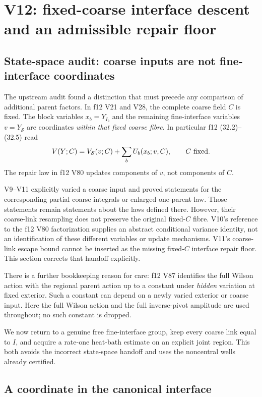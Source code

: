 \documentclass[11pt,oneside]{article}
\begin{document}
\section{V12: fixed-coarse interface descent and an admissible repair floor}
\label{sec:f13v12}

\subsection{State-space audit: coarse inputs are not fine-interface coordinates}

The upstream audit found a distinction that must precede
any comparison of additional parent factors. In f12 V21
and V28, the complete coarse field \(C\) is fixed.
The block variables \(x_b=Y_{I_b}\) and the remaining
fine-interface variables \(v=Y_{\mathcal S}\) are
coordinates \emph{within that fixed coarse fibre}.
In particular f12 (32.2)--(32.5) read
\[
 V(Y;C)=V_{\mathcal S}(v;C)+\sum_bU_b(x_b;v,C),
                      \qquad C\ \hbox{fixed}.
\]
The repair law in f12 V80 updates components of \(v\),
not components of \(C\).

V9--V11 explicitly varied a coarse input and proved
statements for the corresponding partial coarse
integrals or enlarged one-parent law. Those statements
remain statements about the laws defined there.
However, their coarse-link resampling does not preserve
the original fixed-\(C\) fibre. V10's reference to the
f12 V80 factorization supplies an abstract conditional
variance identity, not an identification of these
different variables or update mechanisms. V11's
coarse-link escape bound cannot be inserted as the
missing fixed-\(C\) interface repair floor.
This section corrects that handoff explicitly.

There is a further bookkeeping reason for care: f12
V87 identifies the full Wilson action with the regional
parent action up to a constant under \emph{hidden}
variation at fixed exterior. Such a constant can depend
on a newly varied exterior or coarse input. Here the
full Wilson action and the full inverse-pivot amplitude
are used throughout; no such constant is dropped.

We now return to a genuine free fine-interface group,
keep every coarse link equal to \(I\), and acquire a
rate-one heat-bath estimate on an explicit joint
region. This both avoids the incorrect state-space
handoff and uses the noncentral wells already certified.

\subsection{A coordinate in the canonical interface}
\end{document}
